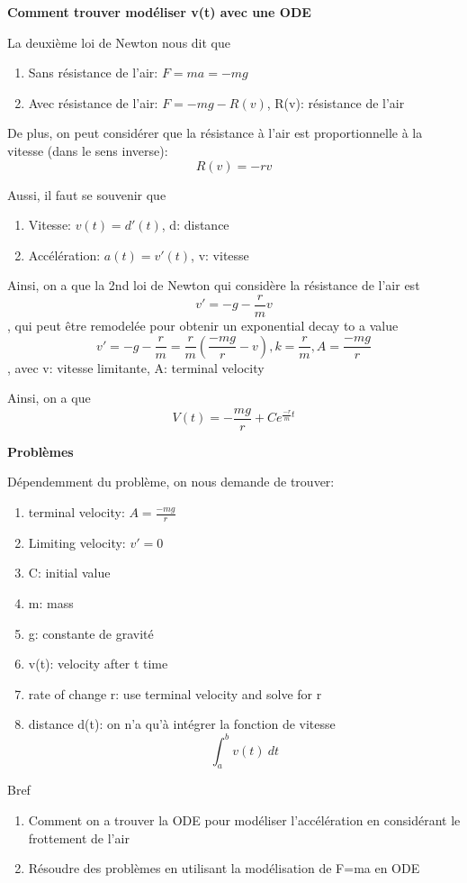 \documentclass{article}
\begin{document}
\textbf{Comment trouver modéliser v(t) avec une ODE}

La deuxième loi de Newton nous dit que
\begin{enumerate}
    \item Sans résistance de l'air: $ F=ma=-mg $
    \item Avec résistance de l'air: $ F=-mg - R(v) $, R(v): résistance
	de l'air
\end{enumerate}

De plus, on peut considérer que la résistance à l'air est proportionnelle
à la vitesse (dans le sens inverse): $$ R(v) = -rv $$

Aussi, il faut se souvenir que
\begin{enumerate}
    \item Vitesse: $ v(t) = d'(t) $, d: distance
    \item Accélération: $ a(t) = v'(t) $, v: vitesse
\end{enumerate}

Ainsi, on a que la 2nd loi de Newton qui considère la résistance de l'air
est $$ v' = -g - \frac{r}{m} v $$, qui peut être remodelée pour obtenir
un exponential decay to a value
$$ v' = -g - \frac{r}{m} = \frac{r}{m} (\frac{-mg}{r} - v),
k = \frac{r}{m}, A = \frac{-mg}{r}$$, avec v: vitesse limitante,
A: terminal velocity

Ainsi, on a que $$ V(t) = -\frac{mg}{r} + C e^{\frac{-r}{m} t} $$

\textbf{Problèmes}

Dépendemment du problème, on nous demande de trouver:
\begin{enumerate}
    \item terminal velocity: $ A = \frac{-mg}{r} $
    \item Limiting velocity: $ v' = 0 $
    \item C: initial value
    \item m: mass
    \item g: constante de gravité
    \item v(t): velocity after t time
    \item rate of change r: use terminal velocity and solve for r
    \item distance d(t): on n'a qu'à intégrer la fonction de vitesse
	$$ \int_{{a}}^{{b}} {v(t)} \: d{t} $$
\end{enumerate}

Bref
\begin{enumerate}
    \item Comment on a trouver la ODE pour modéliser l'accélération
	en considérant le frottement de l'air
    \item Résoudre des problèmes en utilisant la modélisation de F=ma
	en ODE
\end{enumerate}
\end{document}
